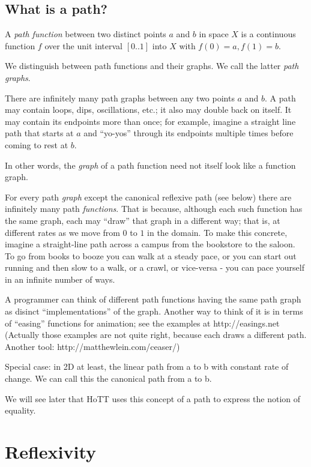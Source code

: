 \documentclass{article}
\begin{document}
\subsection{What is a path?}

A \emph{path function} between two distinct points \(a\) and \(b\) in
space \(X\) is a continuous function \(f\) over the unit interval
\([0..1]\) into \(X\) with \(f(0)=a, f(1)=b\).

We distinguish between path functions and their graphs.  We call the
latter \emph{path graphs}.

There are infinitely many path graphs between any two points \(a\) and
\(b\).  A path may contain loops, dips, oscillations, etc.; it also
may double back on itself.  It may contain its endpoints more than
once; for example, imagine a straight line path that starts at \(a\)
and ``yo-yos'' through its endpoints multiple times before coming to
rest at \(b\).

In other words, the \emph{graph} of a path function need not itself
look like a function graph.

For every path \emph{graph} except the canonical reflexive path (see
below) there are infinitely many path \emph{functions}.  That is
because, although each such function has the same graph, each may
``draw'' that graph in a different way; that is, at different rates as
we move from \(0\) to \(1\) in the domain.  To make this concrete,
imagine a straight-line path across a campus from the bookstore to the
saloon.  To go from books to booze you can walk at a steady pace, or
you can start out running and then slow to a walk, or a crawl, or
vice-versa - you can pace yourself in an infinite number of ways.

A programmer can think of different path functions having the same
path graph as disinct ``implementations'' of the graph.  Another way
to think of it is in terms of ``easing'' functions for animation; see
the examples at http://easings.net (Actually those examples are not
quite right, because each draws a different path.  Another tool:
http://matthewlein.com/ceaser/)

Special case: in 2D at least, the linear path from a to b with
constant rate of change.  We can call this the canonical path from a
to b.

We will see later that HoTT uses this concept of a path to express the
notion of equality.

\section{Reflexivity}
\end{document}
